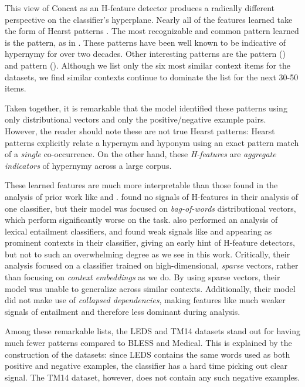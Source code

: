 This view of Concat as an H-feature detector produces a radically different
perspective on the classifier's hyperplane. Nearly all of the features learned
take the form of Hearst patterns \cite{hearst:1992:coling,snow:2004:nips}.  The
most recognizable and common pattern learned is the  pattern, as
in . These patterns have been well known to be
indicative of hypernymy for over two decades. Other interesting patterns are
the  pattern () and 
pattern (). Although we list only the six most similar
context items for the datasets, we find similar contexts continue to dominate
the list for the next 30-50 items.

Taken together, it is remarkable that the model identified these patterns using
only distributional vectors and only the positive/negative example pairs.
However, the reader should note these are not true Hearst patterns: Hearst
patterns explicitly relate a hypernym and hyponym using an exact pattern match
of a {\em single} co-occurrence. On the other hand, these {\em H-features} are
{\em aggregate indicators} of hypernymy across a large corpus.

These learned features are much more interpretable than those found in the
analysis of prior work like  and
.  found no signals of
H-features in their analysis of one classifier, but their model was focused on
{\em bag-of-words} distributional vectors, which perform significantly worse on
the task.  also performed an analysis of lexical
entailment classifiers, and found weak signals like  and 
appearing as prominent contexts in their classifier, giving an early hint of
H-feature detectors, but not to such an overwhelming degree as we see in this
work.  Critically, their analysis focused on a classifier trained on
high-dimensional, {\em sparse} vectors, rather than focusing on {\em context
embeddings} as we do. By using sparse vectors, their model was unable
to generalize across similar contexts. Additionally, their model did not make
use of {\em collapsed dependencies}, making features like  much
weaker signals of entailment and therefore less dominant during analysis.

Among these remarkable lists, the LEDS and TM14 datasets stand out for having
much fewer  patterns compared to BLESS and Medical.
This is explained by the construction of the datasets: since LEDS
contains the same words used as both positive and negative examples, the
classifier has a hard time picking out clear signal. The TM14 dataset, however,
does not contain any such negative examples.

